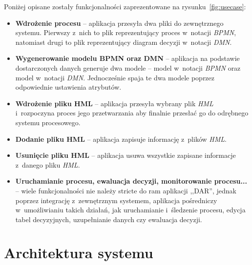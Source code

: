 Poniżej opisane zostały funkcjonalności zaprezentowane na rysunku~\ref{fig:usecase}:
\begin{itemize}
	\item \textbf{Wdrożenie procesu} -- aplikacja przesyła dwa pliki do zewnętrznego systemu. Pierwszy z~nich to plik reprezentujący proces w~notacji \emph{BPMN}, natomiast drugi to plik reprezentujący diagram decyzji w~notacji \emph{DMN}.
	\item \textbf{Wygenerowanie modelu BPMN oraz DMN} -- aplikacja na podstawie dostarczonych danych generuje dwa modele -- model w~notacji \emph{BPMN} oraz model w~notacji \emph{DMN}. Jednocześnie spaja te dwa modele poprzez odpowiednie ustawienia atrybutów.
	\item \textbf{Wdrożenie pliku HML} -- aplikacja przesyła wybrany plik \emph{HML} i~rozpoczyna proces jego przetwarzania aby finalnie przesłać go do odrębnego systemu procesowego. 
    \item \textbf{Dodanie pliku HML} -- aplikacja zapisuje informację z~plików \emph{HML}.
    \item \textbf{Usunięcie pliku HML} -- aplikacja usuwa wszystkie zapisane informacje z~danego pliku \emph{HML}.
    \item \textbf{Uruchamianie procesu, ewaluacja decyzji, monitorowanie procesu...} -- wiele funkcjonalności nie należy stricte do ram aplikacji ,,DAR'', jednak poprzez integrację z~zewnętrznym systemem, aplikacja pośredniczy w~umożliwianiu takich działań, jak uruchamianie i~śledzenie procesu, edycja tabel decyzyjnych, uzupełnianie danych czy ewaluacja decyzji. 
\end{itemize}

\section{Architektura systemu}
\label{sec:architekturaSystemu}

